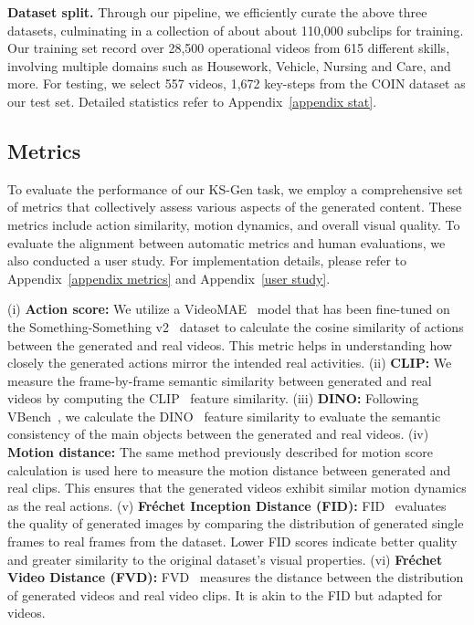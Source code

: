 \textbf{Dataset split.} Through our pipeline, we efficiently curate the above three datasets, culminating in a collection of about about 110,000 subclips for training. Our training set record over 28,500 operational videos from 615 different skills, involving multiple domains such as Housework, Vehicle, Nursing and Care, and more. For testing, we select 557 videos, 1,672 key-steps from the COIN dataset as our test set. Detailed statistics refer to Appendix~\ref{appendix stat}.

\subsection{Metrics}
\label{bench metrics}
To evaluate the performance of our KS-Gen task, we employ a comprehensive set of metrics that collectively assess various aspects of the generated content. These metrics include action similarity, motion dynamics, and overall visual quality. To evaluate the alignment between automatic metrics and human evaluations, we also conducted a user study. For implementation details, please refer to Appendix~\ref{appendix metrics} and Appendix~\ref{user study}.

(i) \textbf{Action score:} We utilize a VideoMAE~\cite{videomae} model that has been fine-tuned on the Something-Something v2~\cite{ssv2} dataset to calculate the cosine similarity of actions between the generated and real videos. This metric helps in understanding how closely the generated actions mirror the intended real activities. (ii) \textbf{CLIP:} We measure the frame-by-frame semantic similarity between generated and real videos by computing the CLIP~\cite{clip} feature similarity. (iii) \textbf{DINO:} Following VBench~\cite{vbench}, we calculate the DINO~\cite{dino} feature similarity to evaluate the semantic consistency of the main objects between the generated and real videos. (iv) \textbf{Motion distance:} The same method previously described for motion score calculation is used here to measure the motion distance between generated and real clips. This ensures that the generated videos exhibit similar motion dynamics as the real actions. (v) \textbf{Fréchet Inception Distance (FID):} FID~\cite{FID} evaluates the quality of generated images by comparing the distribution of generated single frames to real frames from the dataset. Lower FID scores indicate better quality and greater similarity to the original dataset's visual properties. (vi) \textbf{Fréchet Video Distance (FVD):} FVD~\cite{FVD} measures the distance between the distribution of generated videos and real video clips. It is akin to the FID but adapted for videos.